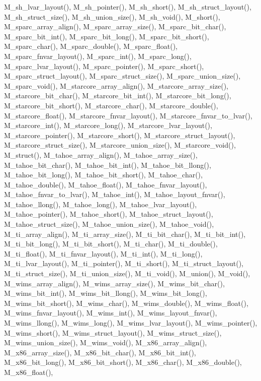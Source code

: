 M\_\-sh\_\-lvar\_\-layout(), M\_\-sh\_\-pointer(), M\_\-sh\_\-short(), M\_\-sh\_\-struct\_\-layout(), M\_\-sh\_\-struct\_\-size(), M\_\-sh\_\-union\_\-size(), M\_\-sh\_\-void(), M\_\-short(), M\_\-sparc\_\-array\_\-align(), M\_\-sparc\_\-array\_\-size(), M\_\-sparc\_\-bit\_\-char(), M\_\-sparc\_\-bit\_\-int(), M\_\-sparc\_\-bit\_\-long(), M\_\-sparc\_\-bit\_\-short(), M\_\-sparc\_\-char(), M\_\-sparc\_\-double(), M\_\-sparc\_\-float(), M\_\-sparc\_\-fnvar\_\-layout(), M\_\-sparc\_\-int(), M\_\-sparc\_\-long(), M\_\-sparc\_\-lvar\_\-layout(), M\_\-sparc\_\-pointer(), M\_\-sparc\_\-short(), M\_\-sparc\_\-struct\_\-layout(), M\_\-sparc\_\-struct\_\-size(), M\_\-sparc\_\-union\_\-size(), M\_\-sparc\_\-void(), M\_\-starcore\_\-array\_\-align(), M\_\-starcore\_\-array\_\-size(), M\_\-starcore\_\-bit\_\-char(), M\_\-starcore\_\-bit\_\-int(), M\_\-starcore\_\-bit\_\-long(), M\_\-starcore\_\-bit\_\-short(), M\_\-starcore\_\-char(), M\_\-starcore\_\-double(), M\_\-starcore\_\-float(), M\_\-starcore\_\-fnvar\_\-layout(), M\_\-starcore\_\-fnvar\_\-to\_\-lvar(), M\_\-starcore\_\-int(), M\_\-starcore\_\-long(), M\_\-starcore\_\-lvar\_\-layout(), M\_\-starcore\_\-pointer(), M\_\-starcore\_\-short(), M\_\-starcore\_\-struct\_\-layout(), M\_\-starcore\_\-struct\_\-size(), M\_\-starcore\_\-union\_\-size(), M\_\-starcore\_\-void(), M\_\-struct(), M\_\-tahoe\_\-array\_\-align(), M\_\-tahoe\_\-array\_\-size(), M\_\-tahoe\_\-bit\_\-char(), M\_\-tahoe\_\-bit\_\-int(), M\_\-tahoe\_\-bit\_\-llong(), M\_\-tahoe\_\-bit\_\-long(), M\_\-tahoe\_\-bit\_\-short(), M\_\-tahoe\_\-char(), M\_\-tahoe\_\-double(), M\_\-tahoe\_\-float(), M\_\-tahoe\_\-fnvar\_\-layout(), M\_\-tahoe\_\-fnvar\_\-to\_\-lvar(), M\_\-tahoe\_\-int(), M\_\-tahoe\_\-layout\_\-fnvar(), M\_\-tahoe\_\-llong(), M\_\-tahoe\_\-long(), M\_\-tahoe\_\-lvar\_\-layout(), M\_\-tahoe\_\-pointer(), M\_\-tahoe\_\-short(), M\_\-tahoe\_\-struct\_\-layout(), M\_\-tahoe\_\-struct\_\-size(), M\_\-tahoe\_\-union\_\-size(), M\_\-tahoe\_\-void(), M\_\-ti\_\-array\_\-align(), M\_\-ti\_\-array\_\-size(), M\_\-ti\_\-bit\_\-char(), M\_\-ti\_\-bit\_\-int(), M\_\-ti\_\-bit\_\-long(), M\_\-ti\_\-bit\_\-short(), M\_\-ti\_\-char(), M\_\-ti\_\-double(), M\_\-ti\_\-float(), M\_\-ti\_\-fnvar\_\-layout(), M\_\-ti\_\-int(), M\_\-ti\_\-long(), M\_\-ti\_\-lvar\_\-layout(), M\_\-ti\_\-pointer(), M\_\-ti\_\-short(), M\_\-ti\_\-struct\_\-layout(), M\_\-ti\_\-struct\_\-size(), M\_\-ti\_\-union\_\-size(), M\_\-ti\_\-void(), M\_\-union(), M\_\-void(), M\_\-wims\_\-array\_\-align(), M\_\-wims\_\-array\_\-size(), M\_\-wims\_\-bit\_\-char(), M\_\-wims\_\-bit\_\-int(), M\_\-wims\_\-bit\_\-llong(), M\_\-wims\_\-bit\_\-long(), M\_\-wims\_\-bit\_\-short(), M\_\-wims\_\-char(), M\_\-wims\_\-double(), M\_\-wims\_\-float(), M\_\-wims\_\-fnvar\_\-layout(), M\_\-wims\_\-int(), M\_\-wims\_\-layout\_\-fnvar(), M\_\-wims\_\-llong(), M\_\-wims\_\-long(), M\_\-wims\_\-lvar\_\-layout(), M\_\-wims\_\-pointer(), M\_\-wims\_\-short(), M\_\-wims\_\-struct\_\-layout(), M\_\-wims\_\-struct\_\-size(), M\_\-wims\_\-union\_\-size(), M\_\-wims\_\-void(), M\_\-x86\_\-array\_\-align(), M\_\-x86\_\-array\_\-size(), M\_\-x86\_\-bit\_\-char(), M\_\-x86\_\-bit\_\-int(), M\_\-x86\_\-bit\_\-long(), M\_\-x86\_\-bit\_\-short(), M\_\-x86\_\-char(), M\_\-x86\_\-double(), M\_\-x86\_\-float(), 